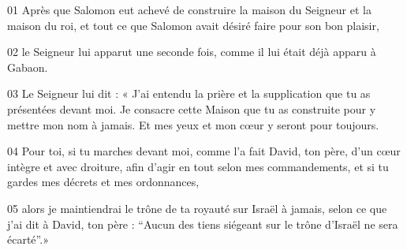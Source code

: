 01 Après que Salomon eut achevé de construire la maison du Seigneur et la maison du roi, et tout ce que Salomon avait désiré faire pour son bon plaisir,

02 le Seigneur lui apparut une seconde fois, comme il lui était déjà apparu à Gabaon.

03 Le Seigneur lui dit : « J’ai entendu la prière et la supplication que tu as présentées devant moi. Je consacre cette Maison que tu as construite pour y mettre mon nom à jamais. Et mes yeux et mon cœur y seront pour toujours.

04 Pour toi, si tu marches devant moi, comme l’a fait David, ton père, d’un cœur intègre et avec droiture, afin d’agir en tout selon mes commandements, et si tu gardes mes décrets et mes ordonnances,

05 alors je maintiendrai le trône de ta royauté sur Israël à jamais, selon ce que j’ai dit à David, ton père : “Aucun des tiens siégeant sur le trône d’Israël ne sera écarté”.»
